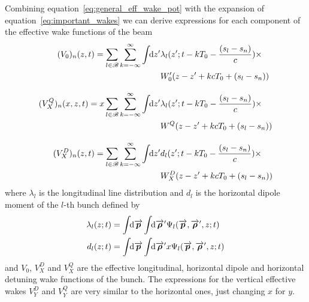     Combining equation~\eqref{eq:general_eff_wake_pot} with the expansion of equation~\eqref{eq:important_wakes} we can derive expressions for each component of the effective wake functions of the beam
    \begin{align}\label{eq:general_eff_long_wake}
	  	(V_0)_n(z, t) =\nonumber \sum_{l\in\mathscr{B}}\sum_{k=-\infty}^\infty\int\!\!\text{d}z' 
	  			&\lambda_l(z'; t-kT_0-\frac{(s_l-s_n)}{c})
				\times\\
				&W'_0(z-z' + kcT_0 + (s_l-s_n))\\[3mm]
	  	(V^Q_X)_n(x, z, t) =\nonumber x\sum_{l\in\mathscr{B}}\sum_{k=-\infty}^\infty\int\!\!\text{d}z' 
	  			&\lambda_l(z'; t-kT_0-\frac{(s_l-s_n)}{c})
				\times\\
				&W^Q(z-z' + kcT_0 + (s_l-s_n))\\[3mm]
	  	(V^D_X)_n(z, t) =\nonumber \sum_{l\in\mathscr{B}}\sum_{k=-\infty}^\infty\int\!\!\text{d}z' 
	  			&d_l(z'; t-kT_0-\frac{(s_l-s_n)}{c})
				\times\\
				&W^D_X(z-z' + kcT_0 + (s_l-s_n))
    \end{align}
    where $\lambda_l$ is the longitudinal line distribution and $d_l$ is the horizontal dipole moment of the $l$-th bunch defined by
    \begin{align}
	  	\lambda_l(z; t) = \udefint{\vect{p}}{\udefint{\vect{\rho}'}{
	  			&\Psi_l(\vect{p},\vect{\rho}',z; t)}}\\
	  	d_l(z; t) = \udefint{\vect{p}}{\udefint{\vect{\rho}'}{
	  			&x\Psi_l(\vect{p},\vect{\rho}',z; t)}}
    \end{align}
    and $V_0$, $V^D_X$ and $V^Q_X$ are the effective longitudinal, horizontal dipole and horizontal detuning wake functions of the bunch. The expressions for the vertical effective wakes $V^D_Y$ and $V^Q_Y$ are very similar to the horizontal ones, just changing $x$ for $y$.

